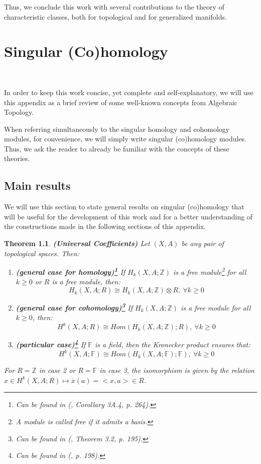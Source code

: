 \documentclass[12pt,oneside]{book}
\newtheorem{teo}    {Theorem}[chapter]
\newcommand{\Z}{\mathbb{Z}}
\newcommand{\F}{\mathbb{F}}
\newcommand{\tensor}{\otimes}
\begin{document}
    Thus, we conclude this work with several contributions to the theory of characteristic classes, both for topological and for generalized 
    manifolds.





    \appendix

    \chapter{Singular (Co)homology}\label{ap_(co)_sing}
    \thispagestyle{empty}

    \

    In order to keep this work concise, yet complete and self-explanatory, we will use this appendix as 
    a brief review of some well-known concepts from Algebraic Topology.

    When referring simultaneously to the singular homology and cohomology modules, for convenience, we 
    will simply write singular (co)homology modules. Thus, we ask the 
    reader to already be familiar with the concepts of these theories.
    
    \section{Main results}\label{ap_principais_res}
    
    We will use this section to state general results on singular (co)homology that will be useful for 
    the development of this work and for a better understanding of the constructions made in the 
    following sections of this appendix.
    
    \begin{teo}{\bf (Universal Coefficients)}
        Let $(X,A)$ be any pair of topological spaces. Then:
        \begin{enumerate}
            \item \textbf{(general case for homology)\footnote{Can be found in (\cite{hatcher}, 
            Corollary 3A.4, p. 264).}} If $H_{k}(X,A;\Z)$ is a free 
            module\footnote{A module is called free if it admits a basis.} for 
            all $k\geq 0$ or $R$ is a free module, then:
            $$ H_{k}(X,A;R)\cong H_{k}(X,A;\Z)\tensor R, \ \forall k\geq 0 $$
            \item \textbf{(general case for cohomology)\footnote{Can be found in (\cite{hatcher}, 
            Theorem 3.2, p. 195).}} If $H_{k}(X,A;\Z)$ is a free module for all $k\geq 0$, then:
            $$ H^{k}(X,A;R)\cong Hom(H_{k}(X,A;\Z);R), \ \forall k\geq 0 $$
            \item \textbf{(particular case)\footnote{Can be found in (\cite{hatcher}, p. 198).}} 
            If $\mathbb{F}$ is a field, then the Kronecker product ensures that:
            $$ H^{k}(X,A;\F)\cong Hom(H_{k}(X,A;\F);\F), \ \forall k\geq 0 $$
        \end{enumerate}
        For $R=\Z$ in case 2 or $R=\F$ in case 3, the isomorphism is given by the relation 
        $x\in H^{k}(X,A;R)\mapsto\overline{x}(a)=<x,a>\in R$.
    \end{teo}
    
\end{document}
